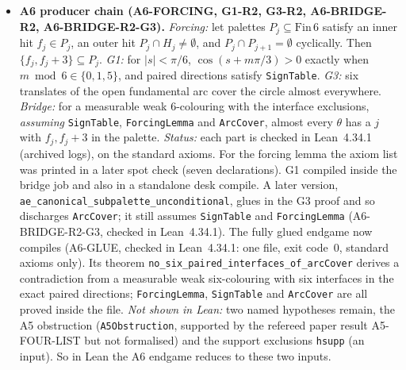 \documentclass[11pt]{article}
\theoremstyle{definition}
\theoremstyle{remark}
\begin{document}
\begin{itemize}
\item \textbf{A6 producer chain (A6-FORCING, G1-R2, G3-R2, A6-BRIDGE-R2, A6-BRIDGE-R2-G3).}
\emph{Forcing:} let palettes $P_j\subseteq\mathrm{Fin}\,6$ satisfy an inner hit
$f_j\in P_j$, an outer hit $P_j\cap H_j\neq\emptyset$, and
$P_j\cap P_{j+1}=\emptyset$ cyclically. Then $\{f_j,f_j+3\}\subseteq P_j$.
\emph{G1:} for $|s|<\pi/6$, $\cos(s+m\pi/3)>0$ exactly when
$m\bmod 6\in\{0,1,5\}$, and paired directions satisfy \texttt{SignTable}.
\emph{G3:} six translates of the open fundamental arc cover the circle almost
everywhere.
\emph{Bridge:} for a measurable weak 6-colouring with the interface
exclusions, \emph{assuming} \texttt{SignTable}, \texttt{ForcingLemma} and
\texttt{ArcCover}, almost every $\theta$ has a $j$ with $f_j,f_j+3$ in the
palette.
\emph{Status:} each part is checked in Lean~4.34.1 (archived logs), on the
standard axioms. For the forcing lemma the axiom list was printed in a later
spot check (seven declarations). G1 compiled inside the bridge job and also in
a standalone desk compile.
A later version, \texttt{ae\_\allowbreak{}canonical\_\allowbreak{}subpalette\_\allowbreak{}unconditional}, glues in the G3 proof and so discharges
\texttt{ArcCover}; it still assumes \texttt{SignTable} and
\texttt{ForcingLemma} (A6-BRIDGE-R2-G3, checked in Lean~4.34.1).
The fully glued endgame now compiles (A6-GLUE, checked in Lean~4.34.1: one file, exit code~0, standard axioms only). Its theorem \texttt{no\_\allowbreak{}six\_\allowbreak{}paired\_\allowbreak{}interfaces\_\allowbreak{}of\_\allowbreak{}arcCover} derives a contradiction from a measurable weak six-colouring with six interfaces in the exact paired directions; \texttt{ForcingLemma}, \texttt{SignTable} and \texttt{ArcCover} are all proved inside the file.
\emph{Not shown in Lean:} two named hypotheses remain, the A5 obstruction (\texttt{A5Obstruction}, supported by the refereed paper result A5-FOUR-LIST but not formalised) and the support exclusions \texttt{hsupp} (an input). So in Lean the A6 endgame reduces to these two inputs.
\end{itemize}
\end{document}
